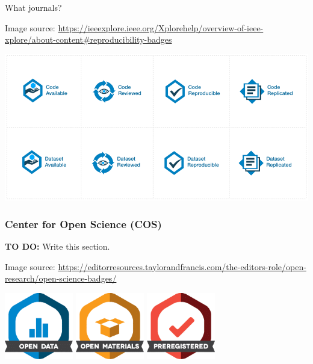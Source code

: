 What journals?

Image source: \url{https://ieeexplore.ieee.org/Xplorehelp/overview-of-ieee-xplore/about-content#reproducibility-badges}

\includegraphics[width=15cm]{images/IEEE_reproducibility_badges.png}

\subsubsection{Center for Open Science (COS)}

\textbf{TO DO:} Write this section.

Image source: \url{https://editorresources.taylorandfrancis.com/the-editors-role/open-research/open-science-badges/}

\includegraphics[width=3cm]{images/Open-Data-OSB.png}
\includegraphics[width=3cm]{images/Open-Materials-OSB.png}
\includegraphics[width=3cm]{images/Preregistered-OSB.png}

